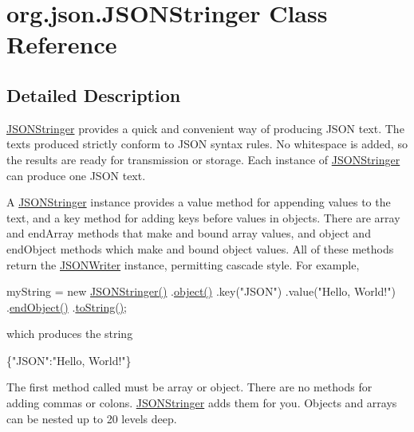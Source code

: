 \hypertarget{classorg_1_1json_1_1JSONStringer}{\section{org.\-json.\-J\-S\-O\-N\-Stringer Class Reference}
\label{classorg_1_1json_1_1JSONStringer}
}


\subsection{Detailed Description}
\hyperlink{classorg_1_1json_1_1JSONStringer}{J\-S\-O\-N\-Stringer} provides a quick and convenient way of producing J\-S\-O\-N text. The texts produced strictly conform to J\-S\-O\-N syntax rules. No whitespace is added, so the results are ready for transmission or storage. Each instance of \hyperlink{classorg_1_1json_1_1JSONStringer}{J\-S\-O\-N\-Stringer} can produce one J\-S\-O\-N text. 

A \hyperlink{classorg_1_1json_1_1JSONStringer}{J\-S\-O\-N\-Stringer} instance provides a {\ttfamily value} method for appending values to the text, and a {\ttfamily key} method for adding keys before values in objects. There are {\ttfamily array} and {\ttfamily end\-Array} methods that make and bound array values, and {\ttfamily object} and {\ttfamily end\-Object} methods which make and bound object values. All of these methods return the \hyperlink{classorg_1_1json_1_1JSONWriter}{J\-S\-O\-N\-Writer} instance, permitting cascade style. For example, 
\begin{DoxyPre}
myString = new \hyperlink{classorg_1_1json_1_1JSONStringer_a36d3accdcf3f40434edd9c33b414d3f9}{JSONStringer()}
    .\hyperlink{classorg_1_1json_1_1JSONWriter_a50ed212b9c8c9f6a57c3ddfc6bf3126a}{object()}
        .key("JSON")
        .value("Hello, World!")
    .\hyperlink{classorg_1_1json_1_1JSONWriter_a25cc931ef86998c61f08b1d5eff22146}{endObject()}
    .\hyperlink{classorg_1_1json_1_1JSONStringer_a2e7f28e99eb46f767b5df8a669e774b4}{toString()};\end{DoxyPre}
 which produces the string 
\begin{DoxyPre}
\{"JSON":"Hello, World!"\}\end{DoxyPre}
 

The first method called must be {\ttfamily array} or {\ttfamily object}. There are no methods for adding commas or colons. \hyperlink{classorg_1_1json_1_1JSONStringer}{J\-S\-O\-N\-Stringer} adds them for you. Objects and arrays can be nested up to 20 levels deep. 

